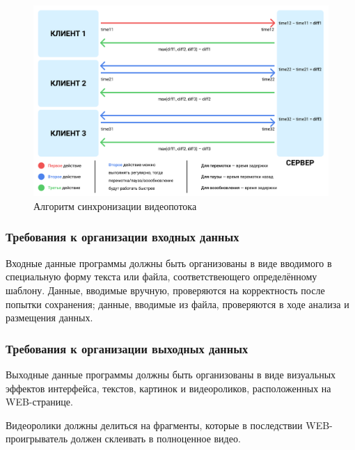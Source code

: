 \begin{figure}[h]
    \centering
    \includegraphics[width=1\linewidth]{images/interaction_format.png}
    \caption{Алгоритм синхронизации видеопотока}
    \label{ris:interaction_format}
\end{figure}

\newpage

\subsubsection{Требования к организации входных данных}
Входные данные программы должны быть организованы в виде вводимого в специальную форму текста или файла,
соответствеющего определённому шаблону.
Данные, вводимые вручную, проверяются на корректность после попытки сохранения;
данные, вводимые из файла, проверяются в ходе анализа и размещения данных.

\subsubsection{Требования к организации выходных данных}
Выходные данные программы должны быть организованы в виде визуальных эффектов интерфейса, текстов, картинок и
видеороликов, расположенных на WEB-странице.

Видеоролики должны делиться на фрагменты, которые в последствии WEB-проигрыватель должен склеивать в полноценное видео.